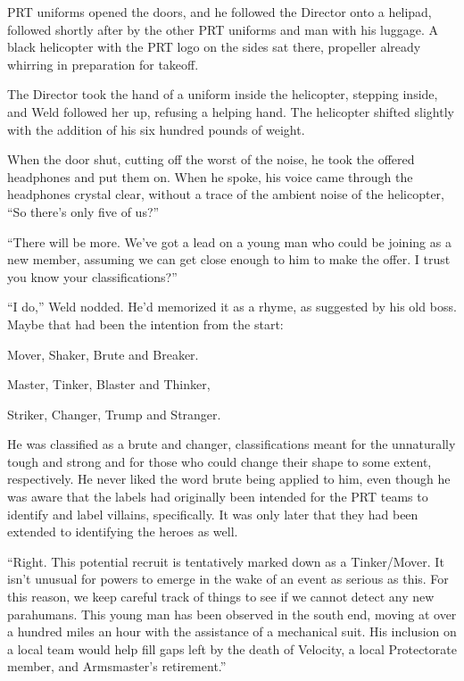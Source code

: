 PRT uniforms opened the doors, and he followed the Director onto a helipad, followed shortly after by the other PRT uniforms and man with his luggage.  A black helicopter with the PRT logo on the sides sat there, propeller already whirring in preparation for takeoff.



The Director took the hand of a uniform inside the helicopter, stepping inside, and Weld followed her up, refusing a helping hand.  The helicopter shifted slightly with the addition of his six hundred pounds of weight.



When the door shut, cutting off the worst of the noise, he took the offered headphones and put them on.  When he spoke, his voice came through the headphones crystal clear, without a trace of the ambient noise of the helicopter, ``So there's only five of us?''



``There will be more.  We've got a lead on a young man who could be joining as a new member, assuming we can get close enough to him to make the offer.  I trust you know your classifications?''



``I do,'' Weld nodded.  He'd memorized it as a rhyme, as suggested by his old boss.  Maybe that had been the intention from the start:



Mover, Shaker,
Brute and Breaker.



Master, Tinker,
Blaster and Thinker, 



Striker, Changer,
Trump and Stranger. 



He was classified as a brute and changer, classifications meant for the unnaturally tough and strong and for those who could change their shape to some extent, respectively.  He never liked the word brute being applied to him, even though he was aware that the labels had originally been intended for the PRT teams to identify and label villains, specifically.  It was only later that they had been extended to identifying the heroes as well.



``Right.  This potential recruit is tentatively marked down as a Tinker/Mover.  It isn't unusual for powers to emerge in the wake of an event as serious as this.  For this reason, we keep careful track of things to see if we cannot detect any new parahumans.  This young man has been observed in the south end, moving at over a hundred miles an hour with the assistance of a mechanical suit.  His inclusion on a local team would help fill gaps left by the death of Velocity, a local Protectorate member, and Armsmaster's retirement.''



